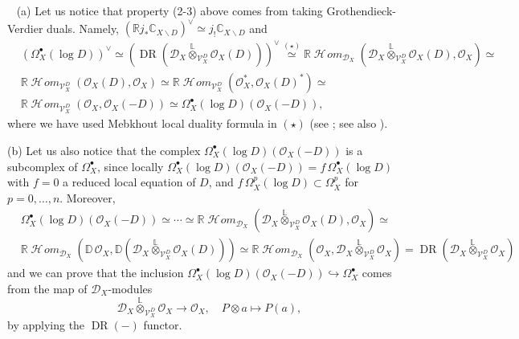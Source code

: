 \documentclass[12pt]{article}
\newcommand{\CC}{\mathbb{C}}
\newcommand{\RR}{\mathbb{R}}
\newcommand{\Lotimes}{\stackrel{\mathbb{L}}{\otimes}}
\DeclareMathOperator{\fHom}{\mathcal{H}\!\mathit{om}}
\DeclareMathOperator{\DR}{DR}
\newcommand{\OO}{\mathcal{O}}
\newcommand{\DD}{\mathcal{D}}
\newcommand{\VV}{\mathcal{V}}
\newcommand{\dsD}{\mathds{D}}
\newcommand{\cO}{\OO}
\newcommand\ssm{\smallsetminus}
\newcommand\beq{\begin{equation}}
\newcommand\eeq{\end{equation}}
\newcounter{numero}[section]
\renewcommand{\thenumero}{(\arabic{section}.\arabic{numero})}
\newenvironment{nota}{\medskip
\refstepcounter{numero}\noindent {\sc  \thenumero\ Remark.}\
}{\vspace{1ex}\par}
\begin{document}
\begin{nota} \label{rem:comple_D-crit-LCT} (a) Let us notice that property (2-3) above comes from taking Grothendieck-Verdier duals. Namely, $\left(\RR j_* \CC_{X\ssm D}\right)^\vee \simeq j_! \CC_{X\ssm D}$ and
\begin{eqnarray*}
&\displaystyle
\left( \Omega^\bullet_X(\log D)\right)^\vee \simeq
\left(\DR\left(\DD_X \Lotimes_{\VV_X^D} \OO_X(D)\right)\right)^\vee \stackrel{(\star)}{\simeq}
\RR\fHom_{\DD_X}\left(\DD_X \Lotimes_{\VV_X^D} \OO_X(D),\OO_X\right) \simeq &
\\
&\displaystyle
\RR\fHom_{\VV_X^D}\left( \OO_X(D),\OO_X\right) \simeq \RR\fHom_{\VV_X^D}\left(\OO_X^*, \OO_X(D)^*\right) \simeq
&
\\
&\displaystyle
\RR\fHom_{\VV_X^D}\left(\OO_X, \OO_X(-D)\right)\simeq \Omega^\bullet_X(\log D)(\cO_X(-D)),
\end{eqnarray*}
where we have used Mebkhout local duality formula in $(\star)$ (see \cite[Chap. I, (4.3)]{meb_formalisme}; see also \cite{narLDT}).

\noindent (b) Let us also notice that the complex $\Omega^\bullet_X(\log D)(\cO_X(-D))$ is a subcomplex of $\Omega^\bullet_X$, since locally $\Omega^\bullet_X(\log D)(\cO_X(-D)) = f\, \Omega^\bullet_X(\log D)$ with $f=0$ a reduced local equation of $D$, and $f\, \Omega^p_X(\log D) \subset \Omega^p_X$ for $p=0,\dots,n$. Moreover,
\begin{eqnarray*}
&\displaystyle
\Omega^\bullet_X(\log D)(\cO_X(-D)) \simeq \cdots \simeq \RR\fHom_{\DD_X}\left(\DD_X \Lotimes_{\VV_X^D} \OO_X(D),\OO_X\right) \simeq
&
\\
&\displaystyle
 \RR\fHom_{\DD_X}\left(\dsD\, \OO_X,\dsD\left(\DD_X \Lotimes_{\VV_X^D} \OO_X(D) \right)\right) \simeq
 \RR\fHom_{\DD_X}\left(\OO_X,\DD_X \Lotimes_{\VV_X^D} \OO_X \right) = \DR \left(\DD_X \Lotimes_{\VV_X^D} \OO_X \right)
\end{eqnarray*}
and we can prove that the inclusion
$\Omega^\bullet_X(\log D)(\cO_X(-D)) \hookrightarrow \Omega^\bullet_X$ comes from the map of $\DD_X$-modules
\beq \label{eq:D-otimes-V-O-O}
\DD_X \Lotimes_{\VV_X^D} \OO_X  \longrightarrow \OO_X,\quad P \otimes a \longmapsto P(a),
\eeq
by applying the $\DR(-)$ functor.
\end{nota}
\end{document}
